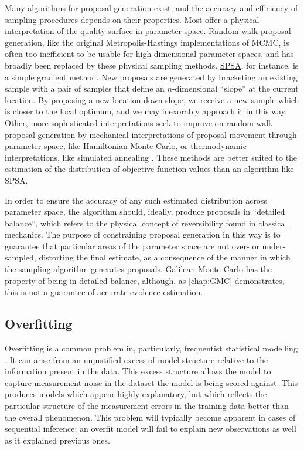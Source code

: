 Many algorithms for proposal generation exist, and the accuracy and efficiency of sampling procedures depends on their properties. Most offer a physical interpretation of the quality surface in parameter space. Random-walk proposal generation, like the original Metropolis-Hastings implementations of MCMC, is often too inefficient to be usable for high-dimensional parameter spaces, and has broadly been replaced by these physical sampling methods. \hyperref[ssec:SPSA]{SPSA}, for instance, is a simple gradient method. New proposals are generated by bracketing an existing sample with a pair of samples that define an $n$-dimensional ``slope'' at the current location. By proposing a new location down-slope, we receive a new sample which is closer to the local optimum, and we may inexorably approach it in this way. Other, more sophisticated interpretations seek to improve on random-walk proposal generation by mechanical interpretations of proposal movement through parameter space, like Hamiltonian Monte Carlo, or thermodynamic interpretations, like simulated annealing \cite{Andrieu2010}. These methods are better suited to the estimation of the distribution of objective function values than an algorithm like SPSA.

In order to ensure the accuracy of any such estimated distribution across parameter space, the algorithm should, ideally, produce proposals in ``detailed balance'', which refers to the physical concept of reversibility found in classical mechanics. The purpose of constraining proposal generation in this way is to guarantee that particular areas of the parameter space are not over- or under-sampled, distorting the final estimate, as a consequence of the manner in which the sampling algorithm generates proposals. \hyperref[ssec:GMC]{Galilean Monte Carlo} has the property of being in detailed balance, although, as \autoref{chap:GMC} demonstrates, this is not a guarantee of accurate evidence estimation.

\subsection{Overfitting}
\label{ssec:overfit}
Overfitting is a common problem in, particularly, frequentist statistical modelling \cite[p.9-11]{Bishop2006}. It can arise from an unjustified excess of model structure relative to the information present in the data. This excess structure allows the model to capture measurement noise in the dataset the model is being scored against. This produces models which appear highly explanatory, but which reflects the particular structure of the measurement errors in the training data better than the overall phenomenon. This problem will typically become apparent in cases of sequential inference; an overfit model will fail to explain new observations as well as it explained previous ones.

